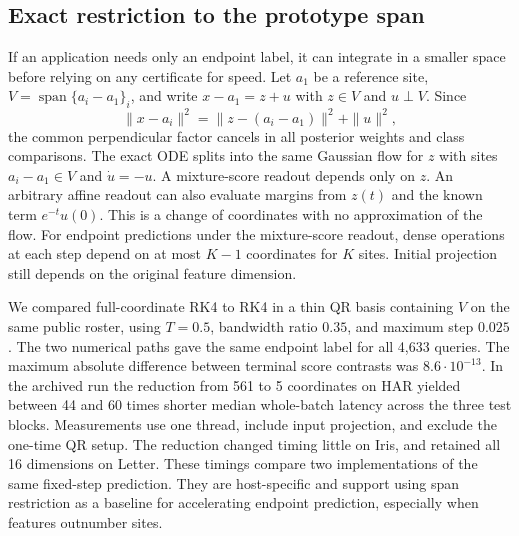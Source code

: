 \subsection{Exact restriction to the prototype span}
If an application needs only an endpoint label, it can integrate in a
smaller space before relying on any certificate for speed. Let $a_1$
be a reference site, $V=\operatorname{span}\{a_i-a_1\}_i$, and write
$x-a_1=z+u$ with $z\in V$ and $u\perp V$. Since
\[
 \|x-a_i\|^2=\|z-(a_i-a_1)\|^2+\|u\|^2,
\]
the common perpendicular factor cancels in all posterior weights and
class comparisons. The exact ODE splits into the same Gaussian flow
for $z$ with sites $a_i-a_1\in V$ and $\dot u=-u$. A mixture-score
readout depends only on $z$. An arbitrary affine readout can also
evaluate margins from $z(t)$ and the known term $e^{-t}u(0)$.
This is a change of coordinates with no approximation of the flow.
For endpoint predictions under the mixture-score readout, dense
operations at each step depend on at most $K-1$ coordinates for $K$
sites. Initial projection still depends on the original feature dimension.

We compared full-coordinate RK4 to RK4 in a thin QR basis containing
$V$ on the same public roster, using $T=0.5$, bandwidth ratio $0.35$,
and maximum step $0.025$. The two numerical paths gave the same
endpoint label for all 4,633 queries. The maximum absolute difference
between terminal score contrasts was $8.6\cdot10^{-13}$. In the archived
run the reduction from 561 to 5 coordinates on HAR yielded between
44 and 60 times shorter median whole-batch latency across the three
test blocks. Measurements use one thread, include input projection, and
exclude the one-time QR setup. The reduction changed timing little on
Iris, and retained all 16 dimensions on Letter. These timings compare
two implementations of the same fixed-step prediction. They are
host-specific and support using span restriction as a baseline for
accelerating endpoint prediction, especially when features outnumber sites.
